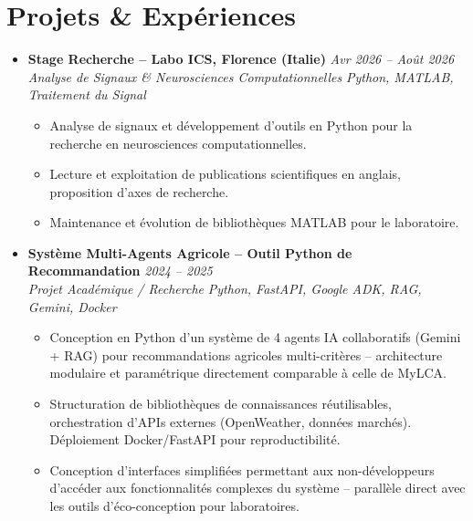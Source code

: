 \documentclass[a4paper,11pt]{article}
\begin{document}
\section{Projets \& Expériences}
\begin{itemize}[leftmargin=*, label={-}]

\item \textbf{Stage Recherche -- Labo ICS, Florence (Italie)} \hfill \textit{Avr 2026 -- Août 2026} \\
\textit{Analyse de Signaux \& Neurosciences Computationnelles} \hfill \textit{Python, MATLAB, Traitement du Signal}
\vspace{-2pt}
    \begin{itemize}[leftmargin=0.4cm, nosep, label=\tiny$\bullet$]
        \item \small{Analyse de signaux et développement d'outils en Python pour la recherche en neurosciences computationnelles.}
        \item \small{Lecture et exploitation de publications scientifiques en anglais, proposition d'axes de recherche.}
        \item \small{Maintenance et évolution de bibliothèques MATLAB pour le laboratoire.}
    \end{itemize}
\vspace{3pt}

\item \textbf{Système Multi-Agents Agricole -- Outil Python de Recommandation} \hfill \textit{2024 -- 2025} \\
\textit{Projet Académique / Recherche} \hfill \textit{Python, FastAPI, Google ADK, RAG, Gemini, Docker}
\vspace{-2pt}
    \begin{itemize}[leftmargin=0.4cm, nosep, label=\tiny$\bullet$]
        \item \small{Conception en Python d'un système de 4 agents IA collaboratifs (Gemini + RAG) pour recommandations agricoles multi-critères -- architecture modulaire et paramétrique directement comparable à celle de MyLCA.}
        \item \small{Structuration de bibliothèques de connaissances réutilisables, orchestration d'APIs externes (OpenWeather, données marchés). Déploiement Docker/FastAPI pour reproductibilité.}
        \item \small{Conception d'interfaces simplifiées permettant aux non-développeurs d'accéder aux fonctionnalités complexes du système -- parallèle direct avec les outils d'éco-conception pour laboratoires.}
    \end{itemize}
\vspace{3pt}


\end{itemize}
\end{document}
